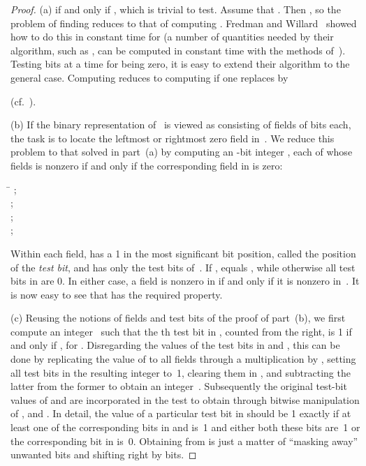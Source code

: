 \documentclass[envcountsame,envcountsect,undated,nolinenumbers]{lnthi}
\begin{document}
\begin{proof}
(a)
 if and only if ,
which is trivial to test.
Assume that .
Then ,
so the problem of finding 
reduces to that of computing .
Fredman and Willard~\cite[pp.\ 431--432]{FreW93}
showed how to do this in
constant time for 
(a number of quantities needed by their algorithm,
such as , can be computed in constant time
with the methods of~\cite{Hag15}).
Testing  bits
at a time for being zero, it is easy to extend
their algorithm to the general case.
Computing
 reduces to computing 
if one replaces  by

(cf.~\cite[Eq.\ 7.1.3-(40)]{Knu10}).

(b) If the binary representation of~
is viewed as consisting of  fields of  bits each,
the task is to locate the leftmost or rightmost
zero field in~.
We reduce this problem to that solved
in part~(a) by computing an -bit
integer , each of whose fields
is nonzero if and only if the corresponding field
in  is zero:

\begin{tabbing}
\quad\=\kill
\>;\\
\>;\\
\>;\\
\>;
\end{tabbing}

\noindent
Within each field,  has a 1 in the most significant
bit position, called the position of the
\emph{test bit}, and
 has only the test bits of~.
If ,  equals , while otherwise
all test bits in  are 0.
In either case, a field is nonzero in  if
and only if it is nonzero in~.
It is now easy to see that 
has the required property.

(c) Reusing the notions of fields and test bits
of the proof of part~(b),
we first compute an integer~ such that the th
test bit in , counted from the right,
is 1 if and only if ,
for .
Disregarding the values of the test bits in 
and , this can be done by replicating the
value of  to all fields through a multiplication
by , setting all test bits in the
resulting integer  to~1, clearing them in ,
and subtracting the latter from the former
to obtain an integer~.
Subsequently the original test-bit values of 
and  are incorporated in the test to obtain 
through bitwise manipulation of ,  and .
In detail, the value of a particular test bit
in  should be 1 exactly if at least one of the
corresponding bits in  and  is~1 and
either both these bits are~1 or the corresponding
bit in  is~0.
Obtaining  from  is just a matter of
``masking away'' unwanted bits and shifting
right by  bits.


\end{proof}
\end{document}
